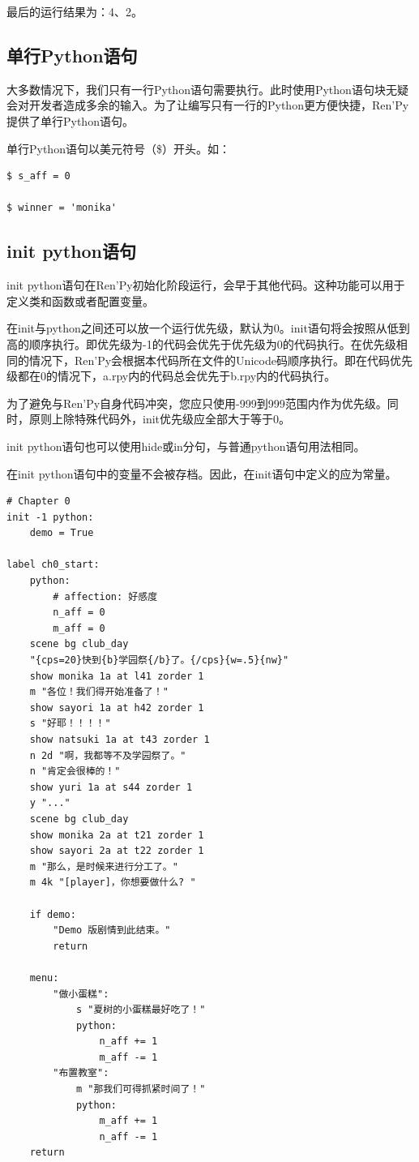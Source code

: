 \documentclass[../../Main.tex]{subfiles}
\begin{document}
最后的运行结果为：4、2。

\subsection{单行Python语句}
大多数情况下，我们只有一行Python语句需要执行。此时使用Python语句块无疑会对开发者造成多余的输入。为了让编写只有一行的Python更方便快捷，Ren'Py提供了单行Python语句。

单行Python语句以美元符号（\$）开头。如：
\begin{lstlisting}
$ s_aff = 0

$ winner = 'monika'
\end{lstlisting}

\subsection{init python语句}
init python语句在Ren'Py初始化阶段运行，会早于其他代码。这种功能可以用于定义类和函数或者配置变量。
\begin{ExtraKnowledge}
    在init与python之间还可以放一个运行优先级，默认为0。init语句将会按照从低到高的顺序执行。即优先级为-1的代码会优先于优先级为0的代码执行。在优先级相同的情况下，Ren'Py会根据本代码所在文件的Unicode码顺序执行。即在代码优先级都在0的情况下，a.rpy内的代码总会优先于b.rpy内的代码执行。
\end{ExtraKnowledge}

\begin{Attention}
    为了避免与Ren'Py自身代码冲突，您应只使用-999到999范围内作为优先级。同时，原则上除特殊代码外，init优先级应全部大于等于0。
\end{Attention}

init python语句也可以使用hide或in分句，与普通python语句用法相同。

在init python语句中的变量不会被存档。因此，在init语句中定义的应为常量。

\begin{lstlisting}
# Chapter 0
init -1 python:
    demo = True

label ch0_start:
    python:
        # affection: 好感度
        n_aff = 0
        m_aff = 0
    scene bg club_day
    "{cps=20}快到{b}学园祭{/b}了。{/cps}{w=.5}{nw}"
    show monika 1a at l41 zorder 1
    m "各位！我们得开始准备了！"
    show sayori 1a at h42 zorder 1
    s "好耶！！！！"
    show natsuki 1a at t43 zorder 1
    n 2d "啊，我都等不及学园祭了。"
    n "肯定会很棒的！"
    show yuri 1a at s44 zorder 1
    y "..."
    scene bg club_day
    show monika 2a at t21 zorder 1
    show sayori 2a at t22 zorder 1
    m "那么，是时候来进行分工了。"
    m 4k "[player]，你想要做什么? "

    if demo:
        "Demo 版剧情到此结束。"
        return

    menu:
        "做小蛋糕":
            s "夏树的小蛋糕最好吃了！"
            python:
                n_aff += 1
                m_aff -= 1
        "布置教室":
            m "那我们可得抓紧时间了！"
            python:
                m_aff += 1
                n_aff -= 1
    return

\end{lstlisting}
\end{document}

